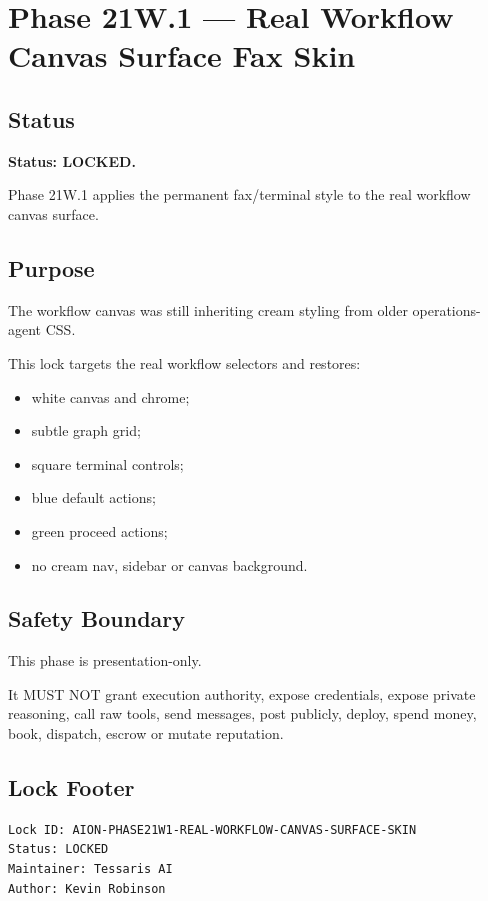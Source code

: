 \section{Phase 21W.1 --- Real Workflow Canvas Surface Fax Skin}

\subsection{Status}

\textbf{Status: LOCKED.}

Phase 21W.1 applies the permanent fax/terminal style to the real workflow canvas surface.

\subsection{Purpose}

The workflow canvas was still inheriting cream styling from older operations-agent CSS.

This lock targets the real workflow selectors and restores:

\begin{itemize}
  \item white canvas and chrome;
  \item subtle graph grid;
  \item square terminal controls;
  \item blue default actions;
  \item green proceed actions;
  \item no cream nav, sidebar or canvas background.
\end{itemize}

\subsection{Safety Boundary}

This phase is presentation-only.

It MUST NOT grant execution authority, expose credentials, expose private reasoning, call raw tools, send messages, post publicly, deploy, spend money, book, dispatch, escrow or mutate reputation.

\subsection{Lock Footer}

\begin{verbatim}
Lock ID: AION-PHASE21W1-REAL-WORKFLOW-CANVAS-SURFACE-SKIN
Status: LOCKED
Maintainer: Tessaris AI
Author: Kevin Robinson
\end{verbatim}
